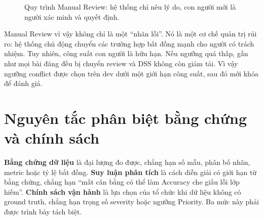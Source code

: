 \begin{figure}[H]
\centering
{}
\caption{Quy trình Manual Review: hệ thống chỉ nêu lý do, con người mới là người
xác minh và quyết định.}
\label{fig:manual-review}
\end{figure}

Manual Review vì vậy không chỉ là một ``nhãn lỗi''. Nó là một cơ chế quản trị
rủi ro:
hệ thống chủ động chuyển các trường hợp bất đồng mạnh cho người có trách nhiệm.
Tuy nhiên, công suất con người là hữu hạn. Nếu ngưỡng quá thấp, gần như mọi
bài đăng đều bị chuyển review và DSS không còn giảm tải. Vì vậy ngưỡng conflict
được chọn trên dev dưới một giới hạn công suất, sau đó mới khóa để đánh giá.

\section{Nguyên tắc phân biệt bằng chứng và chính sách}

\begin{insight}
\textbf{Bằng chứng dữ liệu} là đại lượng đo được, chẳng hạn số mẫu, phân bố
nhãn, metric hoặc tỷ lệ bất đồng. \textbf{Suy luận phân tích} là cách diễn giải
có giới hạn từ bằng chứng, chẳng hạn ``mất cân bằng có thể làm Accuracy che
giấu lỗi lớp hiếm''. \textbf{Chính sách vận hành} là lựa chọn của tổ chức khi
dữ liệu không có ground truth, chẳng hạn trọng số severity hoặc ngưỡng
Priority. Ba mức này phải được trình bày tách biệt.
\end{insight}

